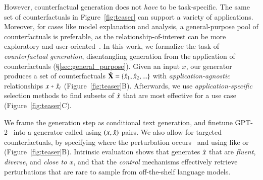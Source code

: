 % 
However, counterfactual generation does not \emph{have} to be task-specific.
The same set of counterfactuals in Figure~\ref{fig:teaser} can support a variety of applications.
Moreover, for cases like model explanation and analysis, a general-purpose pool of counterfactuals is preferable, as the relationship-of-interest can be more exploratory and user-oriented~\cite{wu2019errudite}.
In this work, we formalize the task of \emph{counterfactual generation}, disentangling generation from the application of counterfactuals (\S\ref{sec:general_purpose}).
Given an input $x$, our generator produces a set of counterfactuals $\hat{\mathbf{X}} = \{\hat{x}_1, \hat{x}_2, ...\}$ with \emph{application-agnostic} relationships $x \veryshortarrow \xp_i$ (Figure~\ref{fig:teaser}B).
Afterwards, we use \emph{application-specific} selection methods to find subsets of $\hat{x}$ that are most effective for a use case (Figure~\ref{fig:teaser}C).

We frame the generation step as conditional text generation, and finetune GPT-2~\cite{radford2019language} into a generator called \emph{\sysname} using $(x, \hat{x})$ pairs. 
We also allow for targeted counterfactuals, by specifying where the perturbation occurs~\cite{donahue2020enabling} and using \tagstrs like  or  (Figure~\ref{fig:teaser}B).
Intrinsic evaluation shows that \sysname generates $\hat{x}$ that are \emph{fluent}, \emph{diverse}, and \emph{close to $x$}, and that the \emph{control} mechanisms effectively retrieve perturbations that are rare to sample from off-the-shelf language models. %

